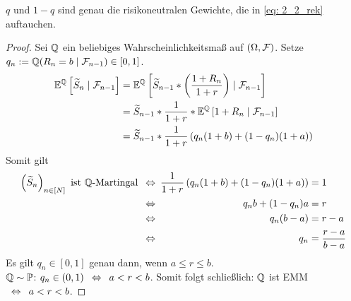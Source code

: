 \begin{*bemerkung_inline}
	$q$ und $1-q$ sind genau die risikoneutralen Gewichte, die in \eqref{eq: 2_2_rek} auftauchen.
\end{*bemerkung_inline}

\begin{proof}
	Sei $\mathbb{Q}$ ein beliebiges Wahrscheinlichkeitsmaß auf $(\Omega, \mathcal{F})$. Setze $q_n \mathrel{:=} \mathbb{Q}(R_n = b \mid \mathcal{F}_{n-1}) \in [0,1]$.
	\begin{equation*}
		\begin{aligned}
			\mathbb{E}^{\mathbb{Q}}\left[ \widetilde{S}_n \mid \mathcal{F}_{n-1} \right] &= \mathbb{E}^{\mathbb{Q}}\left[ \widetilde{S}_{n-1} * \left( \frac{1+R_n}{1+r} \right)  \mid \mathcal{F}_{n-1} \right] \\
			&= \widetilde{S}_{n-1} * \frac{1}{1+r} * \mathbb{E}^{\mathbb{Q}}\left[ 1+R_n \mid \mathcal{F}_{n-1} \right] \\
			&= \widetilde{S}_{n-1} * \frac{1}{1+r} \left( q_n (1+b) + (1-q_n)(1+a) \right)
		\end{aligned}
	\end{equation*}
	Somit gilt 
	\begin{equation*}
		\begin{alignedat}{2}
			\left( \widetilde{S}_n \right)_{n \in [N]} \text{ ist } \mathbb{Q} \text{-Martingal} &\enskip \Leftrightarrow \enskip &\frac{1}{1+r} \left( q_n (1+b) + (1-q_n)(1+a) \right) &= 1 \\
			&\enskip \Leftrightarrow \enskip &q_n b + (1-q_n) a &= r \\
			&\enskip \Leftrightarrow \enskip &q_n (b-a) &= r-a \\
			&\enskip \Leftrightarrow \enskip &q_n &= \frac{r-a}{b-a}
		\end{alignedat}
	\end{equation*}
	Es gilt $q_n \in [0,1]$ genau dann, wenn $a \le r \le b$. \\ 
	$\mathbb{Q} \sim \mathbb{P}$: $q_n \in (0,1) \enskip \Leftrightarrow \enskip a < r < b$.
	Somit folgt schließlich: $\mathbb{Q}$ ist EMM $\enskip \Leftrightarrow \enskip a < r < b$.
\end{proof}

